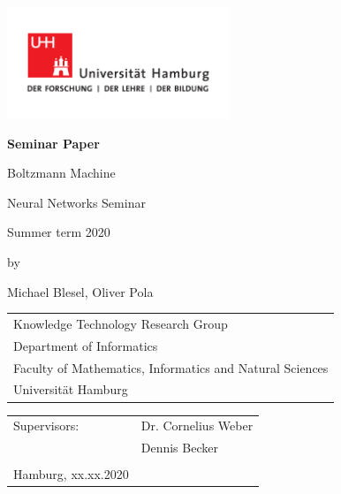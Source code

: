 \documentclass[
	12pt,
	a4paper,
	BCOR10mm,
	DIV14,
	headsepline,
	usegeometry,
]{scrreprt}
\begin{document}

\begin{titlepage}
	\includegraphics[width=0.5\textwidth]{fig/UHH-Logo_2010_Farbe_CMYK}

	\begin{center}
		{\Large \textcolor{uhhred}{\textbf{Seminar Paper}}\par}

		\vspace{1cm}

		{\titlefont\huge Boltzmann Machine\par}

		\vspace{1cm}

		{\large Neural Networks Seminar\par}

		\vspace{1cm}

		{\large Summer term 2020\par}

		\vspace{1cm}

		{\large by\par}

		\vspace{0.5cm}

		{\large Michael Blesel, Oliver Pola\par}
	\end{center}

	\vfill

	{\large\noindent\begin{tabular}{l}
		Knowledge Technology Research Group\\
		Department of Informatics\\
		Faculty of Mathematics, Informatics and Natural Sciences\\
		Universität Hamburg
	\end{tabular}\par}

	\vspace{1cm}

	{\large\noindent\begin{tabular}{ll}
		Supervisors:    		& Dr. Cornelius Weber\\
						& Dennis Becker\\
		\\
		Hamburg, xx.xx.2020
	\end{tabular}\par}
\end{titlepage}
\end{document}
